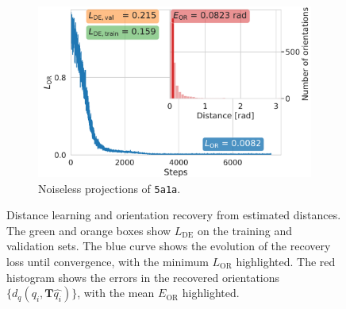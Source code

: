 \begin{figure}[t]
\begin{subfigure}[b]{0.32\linewidth}
        \centering
        \includegraphics[width=\linewidth]{figures/5a1a_quartercov_uniformS2_noise0_halfInplane_ar_aa.pdf}
        \caption{Noiseless projections of \texttt{5a1a}.}%
        \label{fig:5a1a-noise0-orientation-recovery}
    \end{subfigure}
    \caption{%
        Distance learning and orientation recovery from estimated distances.
        The green and orange boxes show $L_\text{DE}$  on the training and validation sets.
        The blue curve shows the evolution of the recovery loss until convergence, with the minimum $L_\text{OR}$  highlighted.
        The red histogram shows the errors in the recovered orientations $\{d_q(q_i, \mathbf{T}\widehat{q_i})\}$, with the mean $E_\text{OR}$  highlighted.
    }
\end{figure}

